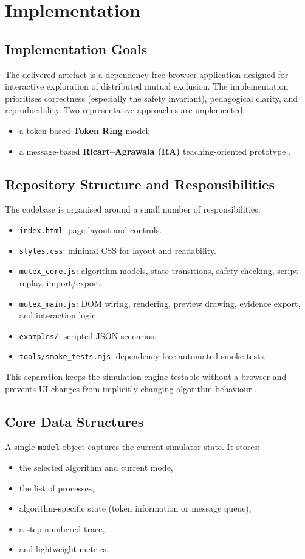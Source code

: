\chapter{Implementation}
\label{ch:implementation}

\section{Implementation Goals}
The delivered artefact is a dependency-free browser application designed for interactive exploration of distributed mutual exclusion. The implementation prioritises correctness (especially the safety invariant), pedagogical clarity, and reproducibility. Two representative approaches are implemented:
\begin{itemize}
  \item a token-based \textbf{Token Ring} model;
  \item a message-based \textbf{Ricart--Agrawala (RA)} teaching-oriented prototype \cite{ricart1981optimal,lamport1978time}.
\end{itemize}

\section{Repository Structure and Responsibilities}
The codebase is organised around a small number of responsibilities:
\begin{itemize}
  \item \texttt{index.html}: page layout and controls.
  \item \texttt{styles.css}: minimal CSS for layout and readability.
  \item \texttt{mutex\_core.js}: algorithm models, state transitions, safety checking, script replay, import/export.
  \item \texttt{mutex\_main.js}: DOM wiring, rendering, preview drawing, evidence export, and interaction logic.
  \item \texttt{examples/}: scripted JSON scenarios.
  \item \texttt{tools/smoke\_tests.mjs}: dependency-free automated smoke tests.
\end{itemize}

This separation keeps the simulation engine testable without a browser and prevents UI changes from implicitly changing algorithm behaviour \cite{gamma1994design}.

\section{Core Data Structures}
A single \texttt{model} object captures the current simulator state. It stores:
\begin{itemize}
  \item the selected algorithm and current mode,
  \item the list of processes,
  \item algorithm-specific state (token information or message queue),
  \item a step-numbered trace,
  \item and lightweight metrics.
\end{itemize}

